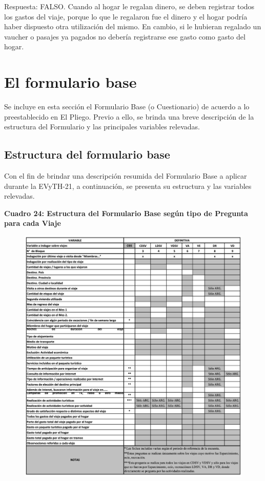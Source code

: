 \documentclass[
  openany]{book}
\begin{document}
Respuesta: FALSO. Cuando al hogar le regalan dinero, se deben registrar todos los gastos del viaje, porque lo que le regalaron fue el dinero y el hogar podría haber dispuesto otra utilización del mismo. En cambio, si le hubieran regalado un vaucher o pasajes ya pagados no debería registrarse ese gasto como gasto del hogar.

\hypertarget{el-formulario-base}{%
\section{El formulario base}\label{el-formulario-base}}

Se incluye en esta sección el Formulario Base (o Cuestionario) de acuerdo a lo preestablecido en El Pliego. Previo a ello, se brinda una breve descripción de la estructura del Formulario y las principales variables relevadas.

\hypertarget{estructura-del-formulario-base}{%
\subsection{Estructura del formulario base}\label{estructura-del-formulario-base}}

Con el fin de brindar una descripción resumida del Formulario Base a aplicar durante la EVyTH-21, a continuación, se presenta su estructura y las variables relevadas.

\textbf{Cuadro 24: Estructura del Formulario Base según tipo de Pregunta para cada Viaje}

\begin{figure}

{\centering \includegraphics[width=1\linewidth]{imagenes/figura6-151} 

}

\end{figure}
\end{document}
